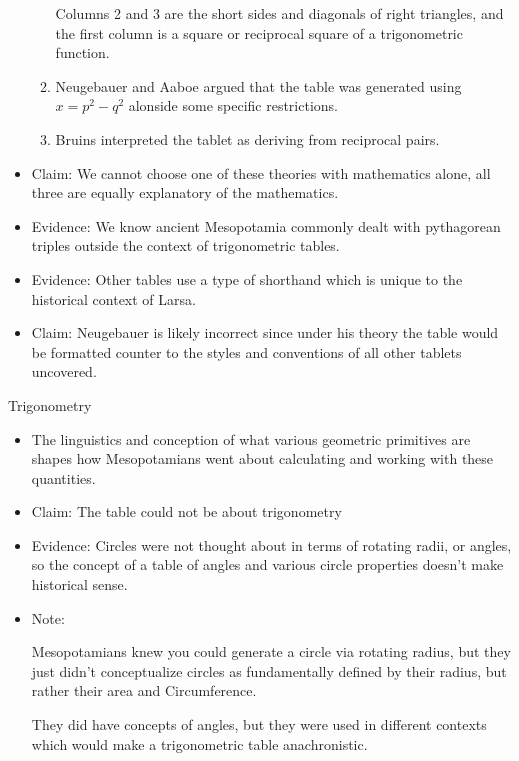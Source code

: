 \documentclass{report}
\begin{document}
\begin{itemize}
\begin{enumerate}
                Columns 2 and 3 are the short sides
                and diagonals of right triangles,
                and the first column is a square or
                reciprocal square of a trigonometric
                function.
            \item Neugebauer and Aaboe argued that the table
                was generated using $x = p^2 - q^2$ 
                alonside some specific restrictions.
            \item Bruins interpreted the tablet
                as deriving from reciprocal
                pairs.
        \end{enumerate}
    \item Claim: We cannot choose one of these
        theories with mathematics alone, all three are
        equally explanatory of the mathematics.
    \item Evidence: We know ancient Mesopotamia commonly dealt
        with pythagorean triples outside the context of
        trigonometric tables.
    \item Evidence: Other tables use a type of shorthand
        which is unique to the historical context of 
        Larsa.
    \item Claim: Neugebauer is likely incorrect since under
        his theory the table would be formatted counter to
        the styles and conventions of all other tablets uncovered.
\end{itemize}
{\large Trigonometry}
\begin{itemize}
    \item The linguistics and conception of what various geometric
        primitives are shapes how Mesopotamians went about
        calculating and working with these quantities.
    \item Claim: The table could not be about trigonometry
    \item Evidence: Circles were not thought about in
        terms of rotating radii, or angles, so the concept
        of a table of angles and various circle properties
        doesn't make historical sense.
    \item Note:
        \begin{mdframed}
            Mesopotamians knew you could generate a circle via
            rotating radius, but they just didn't conceptualize
            circles as fundamentally defined by their
            radius, but rather their area and Circumference.

            They did have concepts of angles, but they
            were used in different contexts which
            would make a trigonometric table anachronistic.
        \end{mdframed}
\end{itemize}
\end{document}

